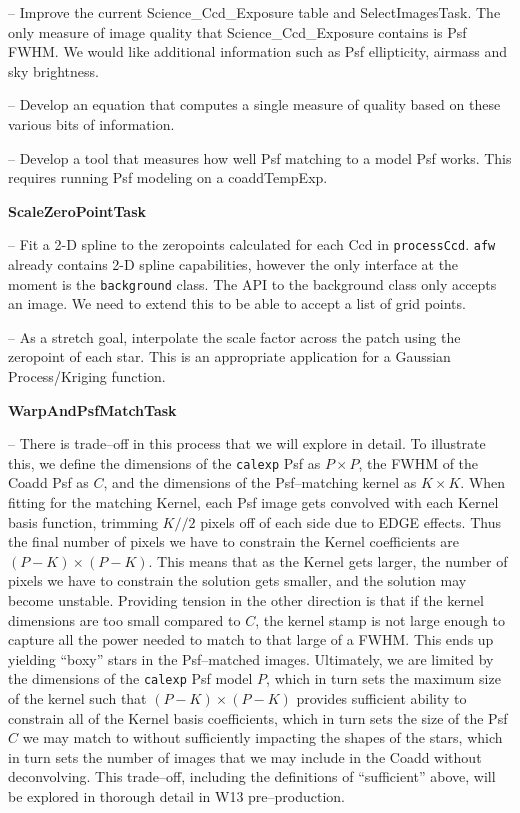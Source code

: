 \documentclass[prd, nofootinbib, floatfix, 11pt,tightenlines,times]{article}
\begin{document}
-- Improve the current Science\_Ccd\_Exposure table and SelectImagesTask.
The only measure of image quality that Science\_Ccd\_Exposure contains is Psf FWHM.
We would like additional information such as Psf ellipticity, airmass and sky brightness.

-- Develop an equation that computes a single measure of quality
based on these various bits of information.

-- Develop a tool that measures how well Psf matching to a model Psf
works. This requires running Psf modeling on a coaddTempExp.


{\bf ScaleZeroPointTask}

--  Fit a 2-D spline to the zeropoints calculated for each Ccd in {\tt processCcd}.   {\tt afw} already contains 2-D spline capabilities, however the only interface at the moment is the {\tt background} class. The API to the background class only accepts an image. We need to extend this  to be able to accept a list of grid points.   

-- As a stretch goal, interpolate the scale factor across the patch using the zeropoint of each star. This is an appropriate application for a Gaussian Process/Kriging function. 

{\bf WarpAndPsfMatchTask}

-- There is trade--off in this process that we will explore in detail.  
To illustrate this, we define the dimensions of
the {\tt calexp} Psf as $P \times P$, the FWHM of the Coadd Psf as
$C$, and the dimensions of the Psf--matching kernel as $K \times K$.
When fitting for the matching Kernel, each Psf image gets convolved
with each Kernel basis function, trimming $K//2$ pixels off of each
side due to EDGE effects.  Thus the final number of pixels we have to
constrain the Kernel coefficients are $(P-K) \times (P-K)$.  This
means that as the Kernel gets larger, the number of pixels we have to
constrain the solution gets smaller, and the solution may become
unstable.  Providing tension in the other direction is that if the
kernel dimensions are too small compared to $C$, the kernel stamp is
not large enough to capture all the power needed to match to that
large of a FWHM.  This ends up yielding ``boxy'' stars in the
Psf--matched images.  Ultimately, we are limited by the dimensions of
the {\tt calexp} Psf model $P$, which in turn sets the maximum size of
the kernel such that $(P-K) \times (P-K)$ provides sufficient ability
to constrain all of the Kernel basis coefficients, which in turn sets
the size of the Psf $C$ we may match to without sufficiently impacting
the shapes of the stars, which in turn sets the number of images that we 
may include in the Coadd without deconvolving.  This trade--off, including the definitions
of ``sufficient'' above, will be explored in thorough detail in W13
pre--production.
\end{document}

